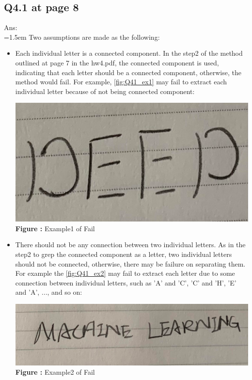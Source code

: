 \documentclass{article}
\begin{document}
	\subsection*{Q4.1 at page 8\texttt{}}
	Ans:\\
	\hangindent=1.5em \hspace{1.5em}Two assumptions are made as the following:
	\begin{itemize}
		\item Each individual letter is a connected component. In the step2 of the method outlined at page 7 in the hw4.pdf, the connected component is used, indicating that each letter should be a connected component, otherwise, the method would fail. For example, \autoref{fig:Q41_ex1} may fail to extract each individual letter because of not being connected component:
		\newline
		\begin{minipage}{1\linewidth}
			\centering
			\hspace{0.12\linewidth} 
			\includegraphics[width=0.4\linewidth]{./Q41_ex1.png}  %
			\newline
			\textbf{Figure \thefigure:} Example1 of Fail %
			\label{fig:Q41_ex1}  %
		\end{minipage}
		\newline
		
		\item There should not be any connection between two individual letters. As in the step2 to grep the connected component as a letter, two individual letters should not be connected, otherwise, there may be failure on separating them. For example the \autoref{fig:Q41_ex2} may fail to extract each letter due to some connection between individual letters, such as 'A' and 'C', 'C' and 'H', 'E' and 'A', ..., and so on:
		\newline
		
		\begin{minipage}{1\linewidth}
		\centering
		\hspace{0.12\linewidth} 
		\includegraphics[width=0.7\linewidth]{./Q41_ex2.png}  %
		\newline
		\textbf{Figure \thefigure:} Example2 of Fail %
		\label{fig:Q41_ex2}  %
		\end{minipage}		
	\end{itemize}
	
\end{document}
